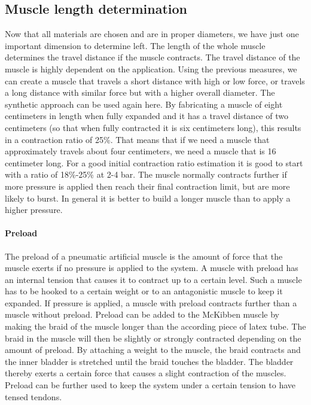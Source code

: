 \documentclass[main]{subfiles}
\begin{document}
\subsection{Muscle length determination}
\label{muscle-length-determination}
Now that all materials are chosen and are in proper diameters, we have just one important dimension to determine left. The length of the whole muscle determines the travel distance if the muscle contracts. The travel distance of the muscle is highly dependent on the application. Using the previous measures, we can create a muscle that travels a short distance with high or low force, or travels a long distance with similar force but with a higher overall diameter. The synthetic approach can be used again here. By fabricating a muscle of eight centimeters in length when fully expanded and it has a travel distance of two centimeters (so that when fully contracted it is six centimeters long), this results in a contraction ratio of 25\%. That means that if we need a muscle that approximately travels about four centimeters, we need a muscle that is 16 centimeter long. For a good initial contraction ratio estimation it is good to start with a ratio of 18\%-25\% at 2-4 bar. The muscle normally contracts further if more pressure is applied then reach their final contraction limit, but are more likely to burst. In general it is better to build a longer muscle than to apply a higher pressure.

\paragraph{Preload}

\label{preload}
The preload of a pneumatic artificial muscle is the amount of force that the muscle exerts if no pressure is applied to the system. A muscle with preload has an internal tension that causes it to contract up to a certain level. Such a muscle has to be hooked to a certain weight or to an antagonistic muscle to keep it expanded. If pressure is applied, a muscle with preload contracts further than a muscle without preload. Preload can be added to the McKibben muscle by making the braid of the muscle longer than the according piece of latex tube. The braid in the muscle will then be slightly or strongly contracted depending on the amount of preload. By attaching a weight to the muscle, the braid contracts and the inner bladder is stretched until the braid touches the bladder. The bladder thereby exerts a certain force that causes a slight contraction of the muscles. Preload can be further used to keep the system under a certain tension to have tensed tendons.
\end{document}
